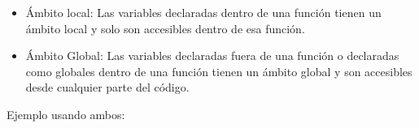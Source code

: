 \begin{itemize}
    \item Ámbito local: Las variables declaradas dentro de una función tienen un ámbito local y solo son accesibles dentro de esa función.
    \begin{figure}[h]
        \centering
      \end{figure}
    \item Ámbito Global: Las variables declaradas fuera de una función o declaradas como globales dentro de una función tienen un ámbito global y son accesibles desde cualquier parte del código.
    \begin{figure}[h]
        \centering
      \end{figure}
\end{itemize}
Ejemplo usando ambos:

\begin{figure}[h]
    \centering
  \end{figure}

